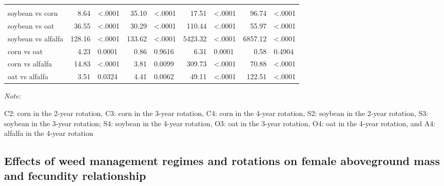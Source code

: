 \documentclass[
]{article}
\begin{document}
\begin{landscape}
\begin{table}
\begin{threeparttable}
\begin{tabular}[t]{lrlr>{}l|rlrl}
\addlinespace[0.3em]
\multicolumn{9}{l}{\textbf{(B) - Crop species effects}}\\
\hspace{1em}soybean vs corn & 8.64 & <.0001 & 35.10 & <.0001 & 17.51 & <.0001 & 96.74 & <.0001\\
\hspace{1em}soybean vs oat & 36.55 & <.0001 & 30.29 & <.0001 & 110.44 & <.0001 & 55.97 & <.0001\\
\hspace{1em}soybean vs alfalfa & 128.16 & <.0001 & 133.62 & <.0001 & 5423.32 & <.0001 & 6857.12 & <.0001\\
\hspace{1em}corn vs oat & 4.23 & 0.0001 & 0.86 & 0.9616 & 6.31 & 0.0001 & 0.58 & 0.4904\\
\hspace{1em}corn vs alfalfa & 14.83 & <.0001 & 3.81 & 0.0099 & 309.73 & <.0001 & 70.88 & <.0001\\
\hspace{1em}oat vs alfalfa & 3.51 & 0.0324 & 4.41 & 0.0062 & 49.11 & <.0001 & 122.51 & <.0001\\
\bottomrule
\end{tabular}
\begin{tablenotes}[para]
\item \textit{Note: } 
\item C2: corn in the 2-year rotation, C3: corn in the 3-year rotation, C4: corn in the 4-year rotation, S2: soybean in the 2-year rotation, S3: soybean in the 3-year rotation; S4: soybean in the 4-year rotation, O3: oat in the 3-year rotation, O4: oat in the 4-year rotation, and A4: alfalfa in the 4-year rotation
\end{tablenotes}
\end{threeparttable}
\end{table}
\end{landscape}

\hypertarget{effects-of-weed-management-regimes-and-rotations-on-female-aboveground-mass-and-fecundity-relationship}{%
\subsection*{Effects of weed management regimes and rotations on female aboveground mass and fecundity relationship}\label{effects-of-weed-management-regimes-and-rotations-on-female-aboveground-mass-and-fecundity-relationship}}
\end{document}
